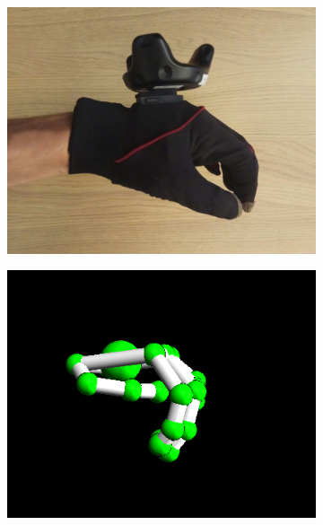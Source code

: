 \documentclass[hyperref, bachelorofscience]{cgvpub}
\begin{document}
\begin{figure}[b!]
\begin{subfigure}{.235\linewidth}
		\includegraphics[width=\linewidth]{../pics/hand_radial_nat}
	\end{subfigure}
	\hspace{.01cm}
	\begin{subfigure}{.235\linewidth}
		\includegraphics[width=\linewidth]{../pics/model_radial_nat}
	\end{subfigure}
	\hfill
	\begin{subfigure}{.235\linewidth}

\end{subfigure}
\end{figure}
\end{document}

